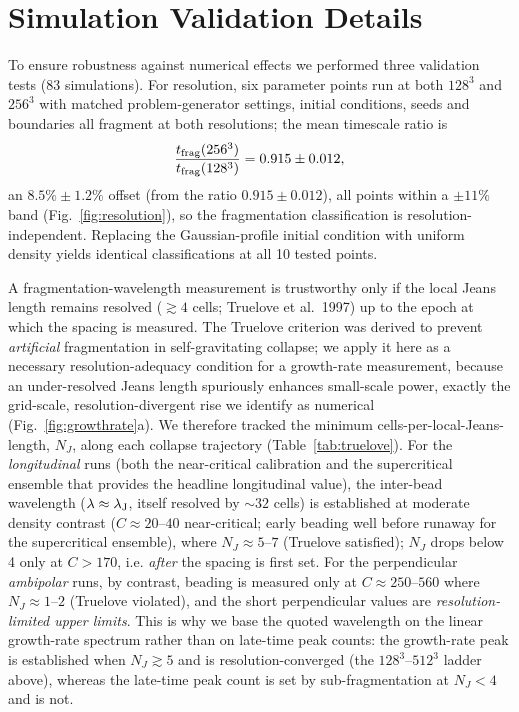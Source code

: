 \documentclass[usenatbib,twoside,twocolumn]{mnras}
\begin{document}
\section{Simulation Validation Details}
\label{sec:validation}

To ensure robustness against numerical effects we performed three validation tests (83 simulations). For resolution, six parameter points run at both $128^3$ and $256^3$ with matched problem-generator settings, initial conditions, seeds and boundaries all fragment at both resolutions; the mean timescale ratio is
\begin{equation}
\frac{t_{\rm frag}(256^3)}{t_{\rm frag}(128^3)} = 0.915 \pm 0.012,
\end{equation}
an $8.5\%\pm1.2\%$ offset (from the ratio $0.915\pm0.012$), all points within a $\pm11\%$ band (Fig.~\ref{fig:resolution}), so the fragmentation classification is resolution-independent. Replacing the Gaussian-profile initial condition with uniform density yields identical classifications at all 10 tested points.

A fragmentation-wavelength measurement is trustworthy only if the local Jeans length remains resolved ($\gtrsim4$ cells; Truelove et al.\ 1997) up to the epoch at which the spacing is measured. The Truelove criterion was derived to prevent \emph{artificial} fragmentation in self-gravitating collapse; we apply it here as a necessary resolution-adequacy condition for a growth-rate measurement, because an under-resolved Jeans length spuriously enhances small-scale power, exactly the grid-scale, resolution-divergent rise we identify as numerical (Fig.~\ref{fig:growthrate}a). We therefore tracked the minimum cells-per-local-Jeans-length, $N_J$, along each collapse trajectory (Table~\ref{tab:truelove}). For the \emph{longitudinal} runs (both the near-critical calibration and the supercritical ensemble that provides the headline longitudinal value), the inter-bead wavelength ($\lambda\approx\lambda_{\rm J}$, itself resolved by $\sim32$ cells) is established at moderate density contrast ($C\approx20$--$40$ near-critical; early beading well before runaway for the supercritical ensemble), where $N_J\approx5$--$7$ (Truelove satisfied); $N_J$ drops below 4 only at $C>170$, i.e. \emph{after} the spacing is first set. For the perpendicular \emph{ambipolar} runs, by contrast, beading is measured only at $C\approx250$--$560$ where $N_J\approx1$--$2$ (Truelove violated), and the short perpendicular values are \emph{resolution-limited upper limits}. This is why we base the quoted wavelength on the linear growth-rate spectrum rather than on late-time peak counts: the growth-rate peak is established when $N_J\gtrsim5$ and is resolution-converged (the $128^3$--$512^3$ ladder above), whereas the late-time peak count is set by sub-fragmentation at $N_J<4$ and is not.
\end{document}
